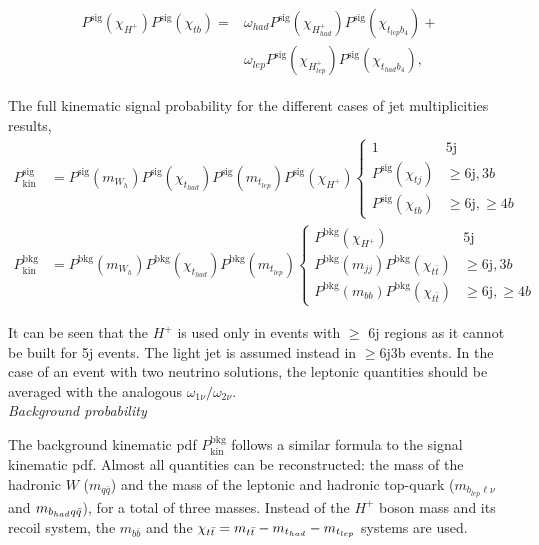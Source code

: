 \begin{align}
    \begin{split}
        P^{\text{sig}}(\chi_{H^+})P^{\text{sig}}(\chi_{tb})=&\omega_{had}P^{\text{sig}}(\chi_{H^+_{had}})P^{\text{sig}}(\chi_{t_{lep}b_4})+\\
        &\omega_{lep}P^{\text{sig}}(\chi_{H^+_{lep}})P^{\text{sig}}(\chi_{t_{had}b_4}),
    \end{split}
\end{align}

The full kinematic signal probability for the different cases of jet multiplicities results,
\begin{align}
    P_{\text{kin}}^{\text{sig}}&=P^{\text{sig}}(m_{W_h})P^{\text{sig}}(\chi_{t_{had}})P^{\text{sig}}(m_{t_{lep}})P^{\text{sig}}(\chi_{H^+})\begin{cases}1 & 5\text{j} \\ P^{\text{sig}}(\chi_{tj})&\geq6\text{j},3b\\P^{\text{sig}}(\chi_{tb})& \geq6\text{j},\geq4b\end{cases}\\
     P_{\text{kin}}^{\text{bkg}}&=P^{\text{bkg}}(m_{W_h})P^{\text{bkg}}(\chi_{t_{had}})P^{\text{bkg}}(m_{t_{lep}})\begin{cases}P^{\text{bkg}}(\chi_{H^+}) & 5\text{j} \\ P^{\text{bkg}}(m_{jj})P^{\text{bkg}}(\chi_{t\bar{t}})&\geq6\text{j},3b\\P^{\text{bkg}}(m_{bb})P^{\text{bkg}}(\chi_{t\bar{t}})& \geq6\text{j},\geq4b\end{cases}
\end{align}

It can be seen that the $H^+$ is used only in events with $\geq$ 6j regions as it cannot be built for 5j events. The light jet is assumed instead in $\geq$6j3b events.
In the case of an event with two neutrino solutions, the leptonic quantities should be averaged with the analogous $\omega_{1\nu}/\omega_{2\nu}$.\\


\textit{Background probability}

The background kinematic pdf $P_{\text{kin}}^{\text{bkg}}$ follows a similar formula to the signal kinematic pdf. Almost all quantities can be reconstructed: the mass of the hadronic $W$ ($m_{q\bar{q}}$) and the mass of the leptonic and hadronic top-quark ($m_{b_{lep}\ell\nu}$ and $m_{b_{had}q\Bar{q}}$), for a total of three masses. Instead of the $H^+$ boson mass and its recoil system, the $m_{b\bar{b}}$ and the $\chi_{t\bar{t}}=m_{t\bar{t}}-m_{t_{had}}-m_{t_{lep}}$ systems are used.\\

